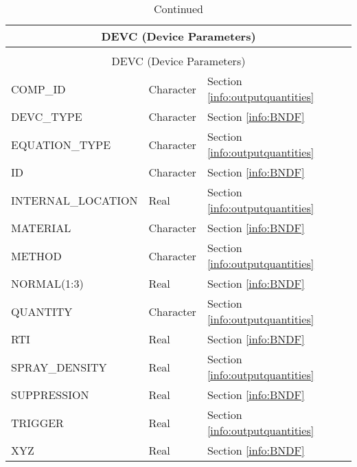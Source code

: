 \begin{longtable}{@{\extracolsep{\fill}}|l|l|l|l|l|}
\caption[Boundary file parameters ({\ct DEVC} namelist group)]{For more information see Section~\ref{info:BNDF}.}
\label{tbl:DEVC} \\
\hline
\multicolumn{5}{|c|}{{\ct DEVC} (Device Parameters)} \\
\hline \hline
\endfirsthead
\caption[]{Continued} \\
\hline
\multicolumn{5}{|c|}{{\ct DEVC} (Device Parameters)} \\
\hline \hline
\endhead
{\ct COMP\_ID}          & Character   & Section \ref{info:outputquantities}     &           &                 \\ \hline
{\ct DEVC\_TYPE}        & Character   & Section \ref{info:BNDF}                 &           &                 \\ \hline
{\ct EQUATION\_TYPE}          & Character   & Section \ref{info:outputquantities}     &           &                 \\ \hline
{\ct ID}        & Character   & Section \ref{info:BNDF}                 &           &                 \\ \hline
{\ct INTERNAL\_LOCATION}          & Real   & Section \ref{info:outputquantities}     &           &                 \\ \hline
{\ct MATERIAL}        & Character   & Section \ref{info:BNDF}                 &           &                 \\ \hline
{\ct METHOD}          & Character   & Section \ref{info:outputquantities}     &           &                 \\ \hline
{\ct NORMAL(1:3)}        & Real   & Section \ref{info:BNDF}                 &           &                 \\ \hline
{\ct QUANTITY }          & Character   & Section \ref{info:outputquantities}     &           &                 \\ \hline
{\ct RTI}        & Real   & Section \ref{info:BNDF}                 &           &                 \\ \hline
{\ct SPRAY\_DENSITY	}          & Real   & Section \ref{info:outputquantities}     &           &                 \\ \hline
{\ct SUPPRESSION}        & Real   & Section \ref{info:BNDF}                 &           &                 \\ \hline
{\ct TRIGGER}          & Real   & Section \ref{info:outputquantities}     &           &                 \\ \hline
{\ct XYZ}        & Real   & Section \ref{info:BNDF}                 &           &                 \\ \hline
\end{longtable}

